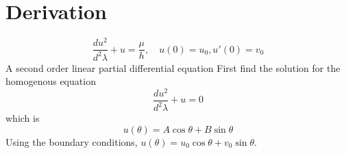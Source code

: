 % 

\section{Derivation}
\label{sec:derive}
\begin{equation}
	\frac{d u^{2}}{d^{2} \lambda} + u = \frac{\mu}{h}, \quad u(0) = u_{0}, u'(0) = v_{0}
\label{eq:forced-oscillator}
\end{equation}
A second order linear partial differential equation \cite{boyce2021elementary}
First find the solution for the homogenous equation
\begin{equation}
	\frac{d u^{2}}{d^{2} \lambda} + u =0
\label{eq:unforced-oscillator}
\end{equation}
which is
\begin{equation}
	u(\theta) = A \cos \theta + B \sin \theta
\label{eq:homogenous}
\end{equation}
Using the boundary conditions, $u(\theta) = u_{0} \cos \theta + v_{0} \sin \theta$.

\endinput  %
